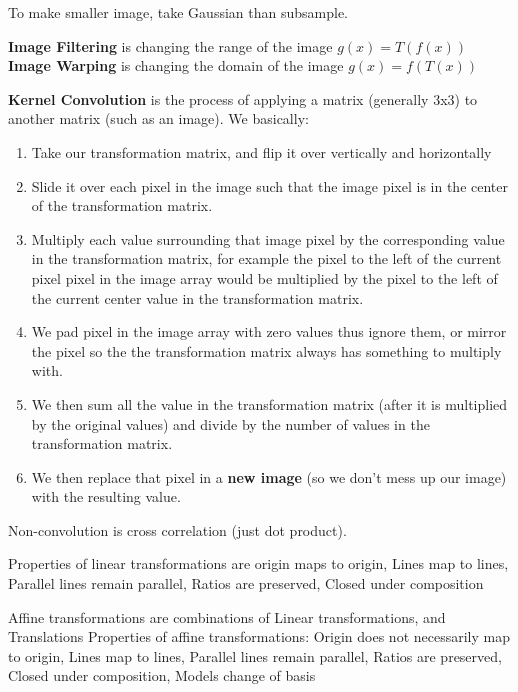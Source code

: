 \documentclass[3pt,landscape]{article}
\begin{document}
\begin{multicols}{3}
To make smaller image, take Gaussian than subsample. 

\textbf{Image Filtering} is changing the range of the image $g(x)=T(f(x))$
\textbf{Image Warping} is changing the domain of the image $g(x)=f(T(x))$

\textbf{Kernel Convolution} is the process of applying a matrix (generally 3x3) to another matrix (such as an image). We basically:
\begin{enumerate}
\item Take our transformation matrix, and flip it over vertically and horizontally 
\item Slide it over each pixel in the image such that the image pixel is in the center of the transformation matrix. 
\item Multiply each value surrounding that image pixel by the corresponding value in the transformation matrix, for example the pixel to the left of the current pixel pixel in the image array would be multiplied by the pixel to the left of the current center value in the transformation matrix. 
\item We pad pixel in the image array with zero values thus ignore them, or mirror the pixel so the the transformation matrix always has something to multiply with. 
\item We then sum all the value in the transformation matrix (after it is multiplied by the original values) and divide by the number of values in the transformation matrix. 
\item We then replace that pixel in a \textbf{new image} (so we don't mess up our image) with the resulting value.
\end{enumerate}

Non-convolution is cross correlation (just dot product).

Properties of linear transformations are origin maps to origin, Lines map to lines, Parallel lines remain parallel, Ratios are preserved, Closed under composition

Affine transformations are combinations of Linear transformations, and Translations
Properties of affine transformations:
Origin does not necessarily map to origin, Lines map to lines, Parallel lines remain parallel, Ratios are preserved, Closed under composition, Models change of basis


\end{multicols}
\end{document}
